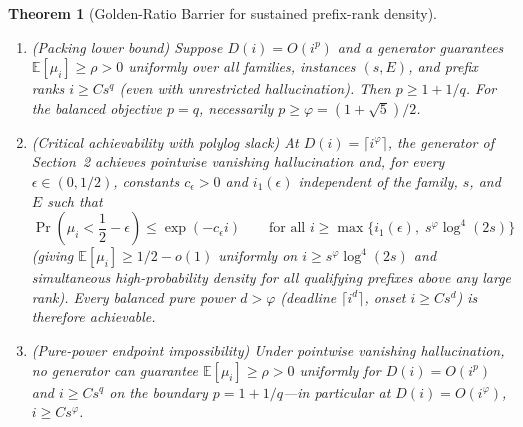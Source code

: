 \documentclass[11pt]{article}
\theoremstyle{plain}
\newtheorem{theorem}{Theorem}
\theoremstyle{definition}
\theoremstyle{remark}
\begin{document}
\begin{theorem}[Golden-Ratio Barrier for sustained prefix-rank density]\label{thm:sustained}
\leavevmode
\begin{enumerate}[label=\textup{(\arabic*)}]
\item \emph{(Packing lower bound)} Suppose $D(i) = O(i^p)$ and a generator guarantees $\mathbb{E}[\mu_i] \ge \rho > 0$ uniformly over all families, instances $(s, E)$, and prefix ranks $i \ge C s^q$ (even with unrestricted hallucination). Then $p \ge 1 + 1/q$. For the balanced objective $p = q$, necessarily $p \ge \varphi = (1 + \sqrt{5})/2$.
\item \emph{(Critical achievability with polylog slack)} At $D(i) = \lceil i^\varphi \rceil$, the generator of Section~2 achieves pointwise vanishing hallucination and, for every $\epsilon \in (0, 1/2)$, constants $c_\epsilon > 0$ and $i_1(\epsilon)$ independent of the family, $s$, and $E$ such that
\[
\Pr\!\left(\mu_i < \frac{1}{2} - \epsilon\right) \le \exp(-c_\epsilon i)
\qquad \text{for all } i \ge \max\!\bigl\{i_1(\epsilon),\; s^\varphi \log^4(2s)\bigr\}
\]
(giving $\mathbb{E}[\mu_i] \ge 1/2 - o(1)$ uniformly on $i \ge s^\varphi \log^4(2s)$ and simultaneous high-probability density for all qualifying prefixes above any large rank). Every balanced pure power $d > \varphi$ (deadline $\lceil i^d \rceil$, onset $i \ge C s^d$) is therefore achievable.
\item \emph{(Pure-power endpoint impossibility)} Under pointwise vanishing hallucination, no generator can guarantee $\mathbb{E}[\mu_i] \ge \rho > 0$ uniformly for $D(i) = O(i^p)$ and $i \ge C s^q$ on the boundary $p = 1 + 1/q$---in particular at $D(i) = O(i^\varphi)$, $i \ge C s^\varphi$.
\end{enumerate}
\end{theorem}
\end{document}

